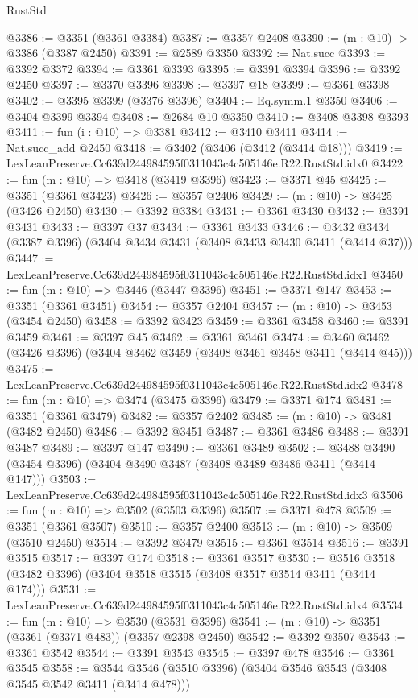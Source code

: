 \begin{lexlean}{RustStd}
\begin{coremodule}
@3386 := @3351 (@3361 @3384)
@3387 := @3357 @2408
@3390 := (m : @10) -> @3386 (@3387 @2450)
@3391 := @2589 @3350
@3392 := Nat.succ
@3393 := @3392 @3372
@3394 := @3361 @3393
@3395 := @3391 @3394
@3396 := @3392 @2450
@3397 := @3370 @3396
@3398 := @3397 @18
@3399 := @3361 @3398
@3402 := @3395 @3399 (@3376 @3396)
@3404 := Eq.symm.{1} @3350
@3406 := @3404 @3399 @3394
@3408 := @2684 @10 @3350
@3410 := @3408 @3398 @3393
@3411 := fun (i : @10) => @3381
@3412 := @3410 @3411
@3414 := Nat.succ_add @2450
@3418 := @3402 (@3406 (@3412 (@3414 @18)))
@3419 := LexLeanPreserve.Cc639d244984595f0311043c4c505146e.R22.RustStd.idx0
@3422 := fun (m : @10) => @3418 (@3419 @3396)
@3423 := @3371 @45
@3425 := @3351 (@3361 @3423)
@3426 := @3357 @2406
@3429 := (m : @10) -> @3425 (@3426 @2450)
@3430 := @3392 @3384
@3431 := @3361 @3430
@3432 := @3391 @3431
@3433 := @3397 @37
@3434 := @3361 @3433
@3446 := @3432 @3434 (@3387 @3396) (@3404 @3434 @3431 (@3408 @3433 @3430 @3411 (@3414 @37)))
@3447 := LexLeanPreserve.Cc639d244984595f0311043c4c505146e.R22.RustStd.idx1
@3450 := fun (m : @10) => @3446 (@3447 @3396)
@3451 := @3371 @147
@3453 := @3351 (@3361 @3451)
@3454 := @3357 @2404
@3457 := (m : @10) -> @3453 (@3454 @2450)
@3458 := @3392 @3423
@3459 := @3361 @3458
@3460 := @3391 @3459
@3461 := @3397 @45
@3462 := @3361 @3461
@3474 := @3460 @3462 (@3426 @3396) (@3404 @3462 @3459 (@3408 @3461 @3458 @3411 (@3414 @45)))
@3475 := LexLeanPreserve.Cc639d244984595f0311043c4c505146e.R22.RustStd.idx2
@3478 := fun (m : @10) => @3474 (@3475 @3396)
@3479 := @3371 @174
@3481 := @3351 (@3361 @3479)
@3482 := @3357 @2402
@3485 := (m : @10) -> @3481 (@3482 @2450)
@3486 := @3392 @3451
@3487 := @3361 @3486
@3488 := @3391 @3487
@3489 := @3397 @147
@3490 := @3361 @3489
@3502 := @3488 @3490 (@3454 @3396) (@3404 @3490 @3487 (@3408 @3489 @3486 @3411 (@3414 @147)))
@3503 := LexLeanPreserve.Cc639d244984595f0311043c4c505146e.R22.RustStd.idx3
@3506 := fun (m : @10) => @3502 (@3503 @3396)
@3507 := @3371 @478
@3509 := @3351 (@3361 @3507)
@3510 := @3357 @2400
@3513 := (m : @10) -> @3509 (@3510 @2450)
@3514 := @3392 @3479
@3515 := @3361 @3514
@3516 := @3391 @3515
@3517 := @3397 @174
@3518 := @3361 @3517
@3530 := @3516 @3518 (@3482 @3396) (@3404 @3518 @3515 (@3408 @3517 @3514 @3411 (@3414 @174)))
@3531 := LexLeanPreserve.Cc639d244984595f0311043c4c505146e.R22.RustStd.idx4
@3534 := fun (m : @10) => @3530 (@3531 @3396)
@3541 := (m : @10) -> @3351 (@3361 (@3371 @483)) (@3357 @2398 @2450)
@3542 := @3392 @3507
@3543 := @3361 @3542
@3544 := @3391 @3543
@3545 := @3397 @478
@3546 := @3361 @3545
@3558 := @3544 @3546 (@3510 @3396) (@3404 @3546 @3543 (@3408 @3545 @3542 @3411 (@3414 @478)))

\end{coremodule}
\end{lexlean}
